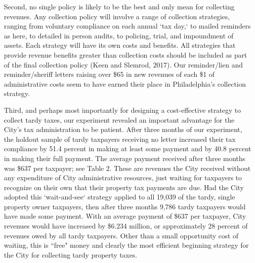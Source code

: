 \documentclass[12pt]{article}
\begin{document}
Second, no single policy is likely to be the best and only mean for
collecting revenues.  Any collection policy will involve a range of
collection strategies, ranging from voluntary compliance on each
annual `tax day,` to mailed reminders as here, to detailed in person
audits, to policing, trial, and impoundment of assets.  Each strategy
will have its own costs and benefits.  All strategies that provide
revenue benefits greater than collection costs should be included as
part of the final collection policy (Keen and Slemrod, 2017).  Our
reminder/lien and reminder/sheriff letters raising over \$65 in new
revenues of each \$1 of administrative costs seem to have earned their
place in Philadelphia's collection strategy.

Third, and perhaps most importantly for designing a cost-effective
strategy to collect tardy taxes, our experiment revealed an important
advantage for the City's tax administration to be patient.  After
three months of our experiment, the holdout sample of tardy taxpayers
receiving no letter increased their tax compliance by 51.4 percent in
making at least some payment and by 40.8 percent in making their full
payment.  The average payment received after three months was \$637
per taxpayer; see Table 2.  These are revenues the City received
without any expenditure of City administrative resources, just waiting
for taxpayers to recognize on their own that their property tax
payments are due.  Had the City adopted this `wait-and-see` strategy
applied to all 19,039 of the tardy, single property owner taxpayers,
then after three months 9,786 tardy taxpayers would have made some
payment.  With an average payment of \$637 per taxpayer, City revenues
would have increased by \$6.234 million, or approximately 28 percent
of revenues owed by all tardy taxpayers.  Other than a small
opportunity cost of waiting, this is ``free" money and clearly the
most efficient beginning strategy for the City for collecting tardy
property taxes.
\end{document}
